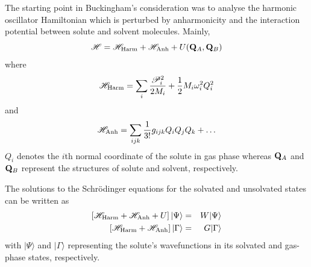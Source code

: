 \documentclass[b5paper,oneside,fleqn,11pt]{book}
\begin{document}
\begin{refsection}
The starting point in Buckingham's consideration was to analyse 
the harmonic oscillator Hamiltonian which is perturbed by anharmonicity
and the interaction potential between solute and solvent molecules. Mainly,
%
\begin{equation}
\mathscr{H} = \mathscr{H}_{\rm Harm} + \mathscr{H}_{\rm Anh} + U({\bf Q}_A,{\bf Q}_B)
\end{equation}
%
where
%
\begin{equation}\label{e:h_harm}
\mathscr{H}_{\rm Harm} = 
\sum_i \frac{\mathscr{P}_i^2}{2M_i} + \frac{1}{2} M_i \omega_i^2 Q_i^2
\end{equation}
%
and
%
\begin{equation}\label{e:h_anh}
\mathscr{H}_{\rm Anh} = 
\sum_{ijk} \frac{1}{3!} g_{ijk} Q_iQ_jQ_k + \ldots 
\end{equation}
%
$Q_i$ denotes the $i$th normal coordinate of the solute in gas phase whereas
${\bf Q}_A$ and ${\bf Q}_B$ represent the structures of solute and solvent, 
respectively.

The solutions to the Schr{\"o}dinger equations for the solvated and 
unsolvated states can be written as
%
\begin{eqnarray}
\left[ \mathscr{H}_{\rm Harm} + \mathscr{H}_{\rm Anh} + U \right] 
\vert \Psi \rangle &=& W \vert \Psi \rangle \\
\left[ \mathscr{H}_{\rm Harm} + \mathscr{H}_{\rm Anh} \right] 
\vert \Gamma \rangle &=& G \vert \Gamma \rangle 
\end{eqnarray}
%
with $\vert\Psi\rangle$ and $\vert\Gamma\rangle$ representing the solute's wavefunctions
in its solvated and gas\hyp{}phase states, respectively.


\end{refsection}
\end{document}

